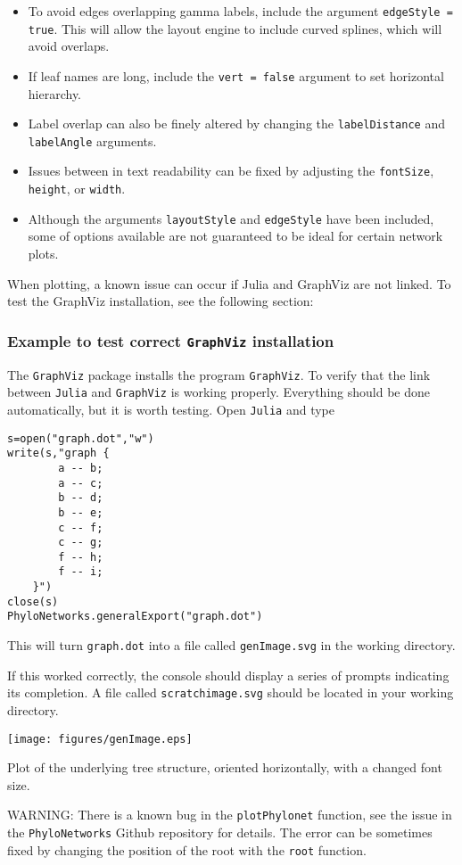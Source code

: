 \documentclass[12pt]{article}
\begin{document}
\begin{itemize}
\item To avoid edges overlapping gamma labels, include the argument \texttt{edgeStyle = true}. This will allow the layout engine to include curved splines, which will avoid overlaps.
\item If leaf names are long, include the \texttt{vert = false} argument to set horizontal hierarchy.
\item Label overlap can also be finely altered by changing the \texttt{labelDistance} and \texttt{labelAngle} arguments.
\item Issues between in text readability can be fixed by adjusting the \texttt{fontSize}, \texttt{height}, or \texttt{width}.
\item Although the arguments \texttt{layoutStyle} and \texttt{edgeStyle} have been included,
  some of options available are not guaranteed to be ideal for certain network plots.
\end{itemize}

When plotting, a known issue can occur if Julia and GraphViz are not
linked. To test the GraphViz installation, see the following section:

\subsubsection{Example to test correct \texttt{GraphViz} installation}

The \texttt{GraphViz} package installs the program
\texttt{GraphViz}. To verify that the link between \texttt{Julia} and
\texttt{GraphViz} is working properly. Everything should be done
automatically, but it is worth testing.  Open \texttt{Julia} and type
\begin{lstlisting}
s=open("graph.dot","w")
write(s,"graph {
		a -- b;
		a -- c;
		b -- d;
		b -- e;
		c -- f;
		c -- g;
        f -- h;
        f -- i;
	}")
close(s)
PhyloNetworks.generalExport("graph.dot")
\end{lstlisting}
This will turn
\texttt{graph.dot} into a file called \texttt{genImage.svg} in the
working directory.

\noindent If this worked correctly, the console should display a series of prompts indicating its completion.
A file called \texttt{scratchimage.svg} should be located in your working directory.

\begin{center}
  \texttt{[image: figures/genImage.eps]}
\end{center}
Plot of the underlying tree structure, oriented horizontally, with a changed font size.


WARNING: There is a known bug in the \texttt{plotPhylonet} function,
see the issue in the \texttt{PhyloNetworks} Github repository for details.
The error can be sometimes fixed by changing the position of the root
with the \texttt{root} function.


\end{document}

